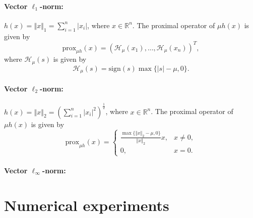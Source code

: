 \documentclass[a4paper]{article}
\newcommand{\norm}[1]{\left\Vert#1\right\Vert}
\newcommand{\mr}{\mathbb{R}}
\newcommand{\mh}{\mathcal{H}}
\newcommand{\prox}{\mathrm{prox}}
\newcommand{\sign}{\mathrm{sign}}
\begin{document}
\paragraph{Vector $\ell_1$-norm:} $h(x) = \norm{x}_1 = 
\sum_{i=1}^{n} |x_i|$, where $x \in \mr^n$. The proximal operator of 
$\mu h(x)$ is given by
\begin{displaymath}
  \prox_{\mu h}(x) = (\mh_{\mu}(x_1), \ldots, \mh_{\mu}(x_n))^T,
\end{displaymath}
where $\mh_{\mu}(s)$ is given by
\begin{displaymath}
  \mh_{\mu}(s) = \sign(s) \max\{ |s| - \mu, 0 \}.
\end{displaymath}

\paragraph{Vector $\ell_2$-norm:} $h(x) = \norm{x}_2 = 
\left( \sum_{i=1}^{n} |x_i|^2 \right)^{\frac{1}{2}}$, where $x \in 
\mr^n$. The proximal operator of $\mu h(x)$ is given by
\begin{displaymath}
  \prox_{\mu h}(x) = 
  \begin{cases}
    \frac{\max\{ \norm{x}_2 - \mu, 0 \}}{\norm{x}_2} x, & x \ne 0, \\
    0, & x = 0.
  \end{cases}
\end{displaymath}


\paragraph{Vector $\ell_\infty$-norm:}




\section{Numerical experiments}
\label{sec:num}




%
%


%
\end{document}
